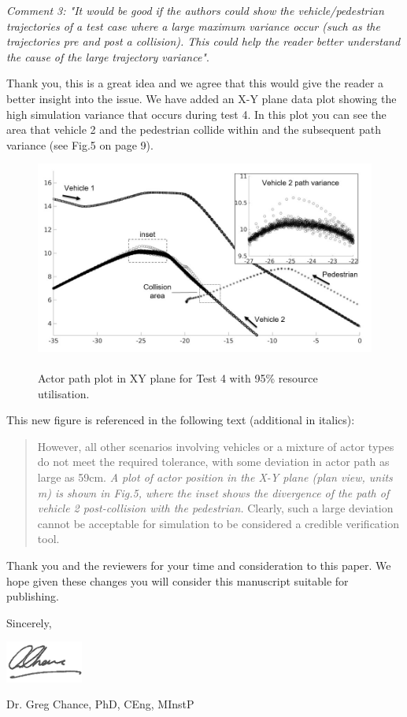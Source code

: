 \documentclass[11pt, a4paper]{letter} %
\begin{document}
\begin{letter}
\bigskip

\textit{Comment 3: "It would be good if the authors could show the vehicle/pedestrian trajectories of a test case where a large maximum variance occur (such as the trajectories pre and post a collision). This could help the reader better understand the cause of the large trajectory variance"}.

Thank you, this is a great idea and we agree that this would give the reader a better insight into the issue. We have added an X-Y plane data plot showing the high simulation variance that occurs during test 4. In this plot you can see the area that vehicle 2 and the pedestrian collide within and the subsequent path variance (see Fig.5 on page 9). 

\begin{figure}
    \centering
    \includegraphics[width=12cm]{../document/other/figures/actor_path_plot.jpg}
    \caption{\\Actor path plot in XY plane for Test 4 with 95\% resource utilisation.}
\end{figure}


This new figure is referenced in the following text (additional in italics):
\begin{quote}
However, all other scenarios involving vehicles or a mixture of actor types do not meet the required tolerance, with some deviation in actor path as large as 59cm. \textit{A plot of actor position in the X-Y plane (plan view, units m) is shown in Fig.5, where the inset shows the divergence of the path of vehicle 2 post-collision with the pedestrian.} Clearly, such a large deviation cannot be acceptable for simulation to be considered a credible verification tool.
\end{quote}

\bigskip

Thank you and the reviewers for your time and consideration to this paper. We hope given these changes you will consider this manuscript suitable for publishing. 

\bigskip

Sincerely,

\bigskip

\includegraphics[width=1in]{signature.png}

Dr. Greg Chance, PhD, CEng, MInstP

\end{letter}
\end{document}
